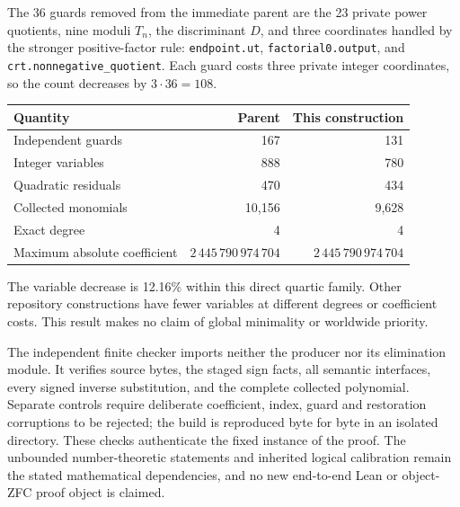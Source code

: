 The 36 guards removed from the immediate parent are the 23 private
power quotients, nine moduli $T_n$, the discriminant $D$, and three
coordinates handled by the stronger positive-factor rule:
\texttt{endpoint.ut}, \texttt{factorial0.output}, and
\texttt{crt.nonnegative\_quotient}.  Each guard costs three private
integer coordinates, so the count decreases by $3\cdot36=108$.

\begin{center}
\begin{tabular}{lrr}
\hline
Quantity&Parent&This construction\\\hline
Independent guards&167&131\\
Integer variables&888&780\\
Quadratic residuals&470&434\\
Collected monomials&10,156&9,628\\
Exact degree&4&4\\
Maximum absolute coefficient&$2\,445\,790\,974\,704$&$2\,445\,790\,974\,704$\\
\hline
\end{tabular}
\end{center}
The variable decrease is 12.16\% within this direct quartic family.
Other repository constructions have fewer variables at different
degrees or coefficient costs.  This result makes no claim of global
minimality or worldwide priority.

The independent finite checker imports neither the producer nor its
elimination module.  It verifies source bytes, the staged sign facts,
all semantic interfaces, every signed inverse substitution, and the
complete collected polynomial.  Separate controls require deliberate
coefficient, index, guard and restoration corruptions to be rejected;
the build is reproduced byte for byte in an isolated directory.
These checks authenticate the fixed instance of the proof.  The
unbounded number-theoretic statements and inherited logical calibration
remain the stated mathematical dependencies, and no new end-to-end
Lean or object-ZFC proof object is claimed.
